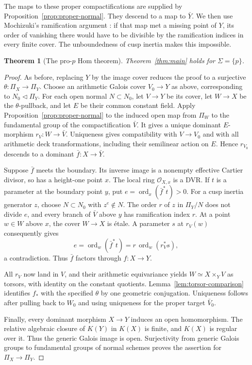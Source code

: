 \documentclass[11pt,a4paper]{article}
\numberwithin{equation}{section}
\theoremstyle{plain}
\newtheorem{theorem}{Theorem}[section]
\theoremstyle{definition}
\theoremstyle{remark}
\newcommand{\cO}{\mathcal O}
\newcommand{\etale}{\'etale}
\DeclareMathOperator{\ord}{ord}
\begin{document}
The maps to these proper compactifications are supplied by
Proposition~\ref{prop:proper-normal}. They descend to a map to
$\bar Y$. We then use Mochizuki's ramification argument
\cite[proof of Corollary~14.2]{Mochizuki1999}:
if that map met a missing point of $Y$, its order of
vanishing there would have to be divisible by the ramification indices
in every finite cover. The unboundedness of cusp inertia makes this
impossible.

\begin{theorem}[The pro-$p$ Hom theorem]
\label{thm:pro-p}
Theorem~\ref{thm:main} holds for $\Sigma=\{p\}$.
\end{theorem}
\begin{proof}
As before, replacing $Y$ by the image cover reduces the proof to a
surjective $\theta:\Pi_X\to\Pi_Y$. Choose an arithmetic Galois
cover $V_0\to Y$ as above, corresponding to $N_0\triangleleft\Pi_Y$.
For each open normal $N\subset N_0$, let $V\to Y$ be its cover, let
$W\to X$ be the $\theta$-pullback, and let $E$ be their common constant
field. Apply Proposition~\ref{prop:proper-normal} to the induced open
map from $\Pi_W$ to the fundamental group of the compactification
$\bar V$. It gives a unique dominant $E$-morphism $r_V:W\to\bar V$.
Uniqueness gives compatibility with $V\to V_0$ and with all arithmetic
deck transformations, including their semilinear action on $E$.
Hence $r_{V_0}$ descends to a dominant $\bar f:X\to\bar Y$.

Suppose $\bar f$ meets the boundary. Its inverse image is a nonempty
effective Cartier divisor, so has a height-one point $x$.
The local ring $\cO_{X,x}$ is a DVR. If $t$ is a parameter at the
boundary point $y$, put $e=\ord_x(\bar f^*t)>0$. For a cusp inertia
generator $z$, choose $N\subset N_0$ with $z^e\notin N$. The order
$r$ of $z$ in $\Pi_Y/N$ does not divide $e$, and every branch of
$\bar V$ above $y$ has ramification index $r$. At a point $w\in W$
above $x$, the cover $W\to X$ is \etale. A parameter $s$ at
$r_V(w)$ consequently gives
\[
              e=\ord_w(\bar f^*t)=r\,\ord_w(r_V^*s),
\]
a contradiction. Thus $\bar f$ factors through $f:X\to Y$.

All $r_V$ now land in $V$, and their arithmetic equivariance yields
$W\simeq X\times_YV$ as torsors, with identity on the constant
quotients. Lemma~\ref{lem:torsor-comparison} identifies $f_*$ with the
specified $\theta$ by one geometric conjugation. Uniqueness follows
after pulling back to $W_0$ and using uniqueness for the proper target
$\bar V_0$.

Finally, every dominant morphism $X\to Y$ induces an open
homomorphism. The relative algebraic closure of $K(Y)$ in $K(X)$ is
finite, and $K(X)$ is regular over it. Thus the generic Galois image is
open. Surjectivity from generic Galois groups to fundamental groups of
normal schemes \cite[Expos\'e~V, Proposition~8.2]{SGA1}
proves the assertion for $\Pi_X\to\Pi_Y$.
\end{proof}
\end{document}
